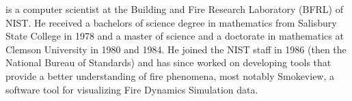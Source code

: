 \item[Glenn Forney] is a computer scientist at the Building and Fire Research Laboratory (BFRL) of NIST. He received a bachelors of science degree in mathematics from
 Salisbury State College in 1978 and a master of science and a doctorate in mathematics at Clemson University in 1980 and 1984.  He joined the NIST staff in 1986 (then the National Bureau of Standards) and has since worked on developing tools that provide a better understanding of fire phenomena, most notably Smokeview, a software tool for visualizing Fire Dynamics Simulation data.
